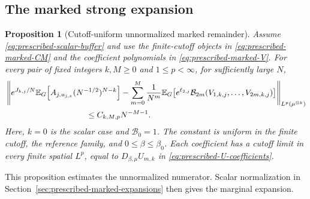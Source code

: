 \documentclass[11pt,reqno]{amsart}
\numberwithin{equation}{section}
\theoremstyle{plain}
\newtheorem{prop}[prop]{Proposition}
\theoremstyle{definition}
\newcommand{\E}{\mathbb E}
\newcommand{\be}{\beta}
\begin{document}
\subsection{The marked strong expansion}

\begin{prop}[Cutoff-uniform unnormalized marked remainder]
\label{prop:prescribed-marked-remainder}
Assume \eqref{eq:prescribed-scalar-buffer} and use the finite-cutoff objects in \eqref{eq:prescribed-marked-CM} and the coefficient polynomials in \eqref{eq:prescribed-marked-V}. For every pair of fixed integers $k,M\geq0$ and $1\leq p<\infty$, for sufficiently large $N$,
\begin{align}
 &\left\|e^{J_{k,j}/N}\E_G\!\left[A_{j,u_{j,x}}(N^{-1/2})^{N-k}\right]
 -\sum_{m=0}^{M}\frac{1}{N^m}
 \E_G\!\left[e^{\ell_{2,j}}\mathcal B_{2m}
 (V_{1,k,j},\ldots,V_{2m,k,j})\right]\right\|_{L^p(\mu^{\otimes k})}
 \notag\\
 &\hspace{35mm}\leq C_{k,M,p}N^{-M-1}.
 \label{eq:prescribed-marked-unnormalized-remainder}
\end{align}
Here, $k=0$ is the scalar case and $\mathcal B_0=1$. The constant is uniform in the finite cutoff, the reference family, and $0\leq\be\leq\be_0$. Each coefficient has a cutoff limit in every finite spatial $L^p$, equal to $D_{\be,\mu}U_{m,k}$ in \eqref{eq:prescribed-U-coefficients}. \end{prop}

This proposition estimates the unnormalized numerator. Scalar normalization in Section~\ref{sec:prescribed-marked-expansions} then gives the marginal expansion.
\end{document}
